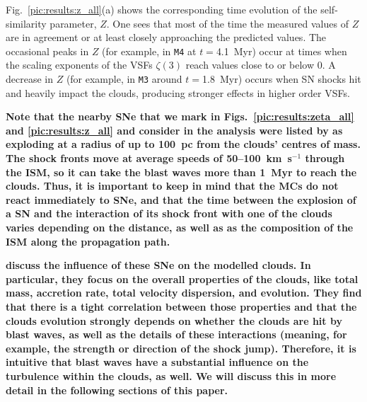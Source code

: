 Fig.~\ref{pic:results:z_all}(a) shows the corresponding time evolution of the self-similarity parameter, $Z$. 
One sees that most of the time the measured values of $Z$ are in agreement or at least closely approaching the predicted values. 
The occasional peaks in $Z$ (for example, in \texttt{M4} at $t=$4.1~Myr) occur at times when the scaling exponents of the VSFs $\zeta(3)$ reach values close to or below 0.
A decrease in $Z$ (for example, in \texttt{M3} around $t=$1.8~Myr) occurs when SN shocks hit and heavily impact the clouds, producing stronger effects in higher order VSFs.

\textbf{
	Note that the nearby SNe that we mark in Figs.~\ref{pic:results:zeta_all} and \ref{pic:results:z_all} and consider in the analysis were listed by  as exploding at a radius of up to 100~pc from the clouds' centres of mass. The shock fronts move at average speeds of 50--100~km~s$^{-1}$ through the ISM, so it can take the blast waves more than 1~Myr to reach the clouds. Thus, it is important to keep in mind that the MCs do not react immediately to SNe, and that the time between the explosion of a SN and the interaction of its shock front with one of the clouds varies depending on the distance, as well as as the composition of the ISM along the propagation path.
}

\textbf{
	 discuss the influence of these SNe on the modelled clouds.
	In particular, they focus on the overall properties of the clouds, like total mass, accretion rate, total velocity dispersion, and evolution.
	They find that there is a tight correlation between those properties and that the clouds evolution strongly depends on whether the clouds are hit by blast waves, as well as the details of these interactions (meaning, for example, the strength or direction of the shock jump).
	Therefore, it is intuitive that blast waves have a substantial influence on the turbulence within the clouds, as well. 
	We will discuss this in more detail in the following sections of this paper.
}

